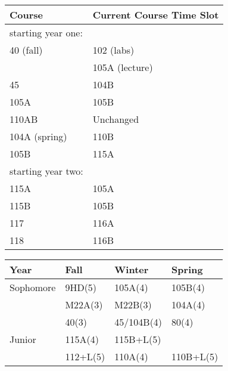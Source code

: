 \documentclass[12pt]{article}
\begin{document}
\noindent
\vskip 0.25cm
\begin{center}
\begin{tabular}{|ll|}
\hline
Course    & Current Course Time Slot \\
\hline
starting year one: & \\
40 (fall)     & 102 (labs) \\
              & 105A (lecture) \\
45            & 104B \\
105A          & 105B \\
110AB         & Unchanged \\
104A (spring) & 110B \\
105B          & 115A \\
\hline
starting year two: & \\
115A          & 105A \\
115B          & 105B \\
117           & 116A \\
118           & 116B \\
\hline
\end{tabular}
\end{center}


\newpage

\label{tbl:guide-first}
\begin{center}
\begin{tabular}{|l|l|l|l|}
\hline
Year      & Fall    & Winter & Spring \\
\hline
Sophomore & 9HD(5)        & 105A(4)       & 105B(4)  \\
          & M22A(3)       & M22B(3)       & 104A(4)  \\
          & 40(3)         & 45/104B(4)    & 80(4) \\
\hline
Junior    & 115A(4) & 115B+L(5)  & \\
          & 112+L(5)  & 110A(4)  & 110B+L(5)\\
\hline 
\end{tabular}
\vskip 1cm
\end{center}
\end{document}
